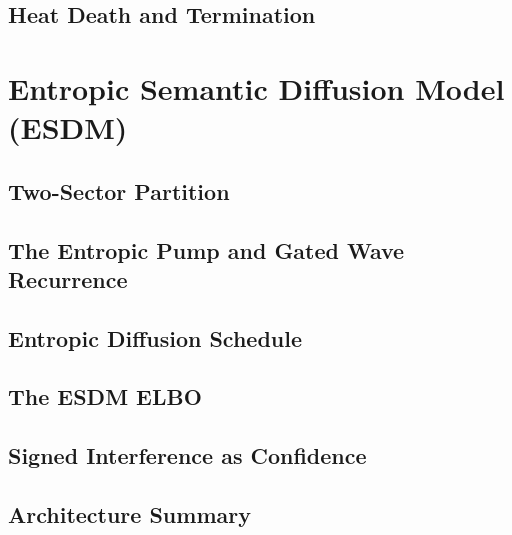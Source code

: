 \documentclass[11pt]{article}
\begin{document}
  \subsection{Heat Death and Termination}
  \label{sec:heat_death}

\section{Entropic Semantic Diffusion Model (ESDM)}
\label{sec:esdm}

  \subsection{Two-Sector Partition}
  \label{sec:partition}

  \subsection{The Entropic Pump and Gated Wave Recurrence}
  \label{sec:wave_recurrence}

  \subsection{Entropic Diffusion Schedule}
  \label{sec:schedule}

  \subsection{The ESDM ELBO}
  \label{sec:elbo}

  \subsection{Signed Interference as Confidence}
  \label{sec:confidence}

  \subsection{Architecture Summary}
  \label{sec:architecture}
\end{document}
